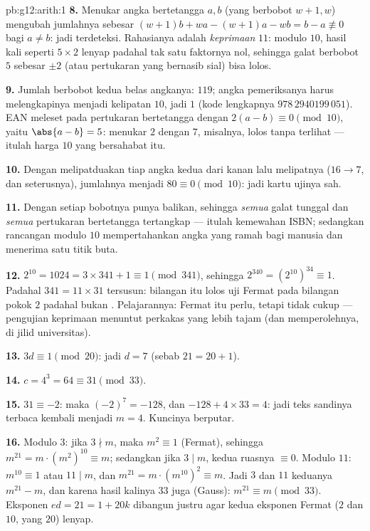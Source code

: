 \begin{solution}{pb:g12:arith:1}
\textbf{8.} Menukar angka bertetangga $a, b$ (yang berbobot
$w + 1, w$) mengubah jumlahnya sebesar
$(w+1)b + wa - (w+1)a - wb = b - a \not\equiv 0$ bagi
$a \neq b$: jadi terdeteksi. Rahasianya adalah \emph{keprimaan}
$11$: modulo $10$, hasil kali seperti $5 \times 2$ lenyap padahal
tak satu faktornya nol, sehingga galat berbobot $5$ sebesar $\pm 2$ (atau
pertukaran yang bernasib sial) bisa lolos.

\textbf{9.} Jumlah berbobot kedua belas angkanya: $119$; angka
pemeriksanya harus melengkapinya menjadi kelipatan $10$, jadi $1$ (kode
lengkapnya $978\,2940199\,051$). EAN meleset pada pertukaran bertetangga
dengan $2(a - b) \equiv 0 \pmod{10}$, yaitu
$\abs{a - b} = 5$: menukar $2$ dengan $7$, misalnya, lolos
tanpa terlihat --- itulah harga  $10$ yang bersahabat itu.

\textbf{10.} Dengan melipatduakan tiap angka kedua dari kanan lalu
melipatnya ($16 \to 7$, dan seterusnya), jumlahnya menjadi $80 \equiv 0
\pmod{10}$: jadi kartu ujinya sah.

\textbf{11.} Dengan   setiap bobotnya punya balikan,
sehingga \emph{semua} galat tunggal dan \emph{semua} pertukaran
bertetangga tertangkap --- itulah kemewahan ISBN; sedangkan rancangan modulo
$10$ mempertahankan angka yang ramah bagi manusia dan menerima satu titik buta.

\textbf{12.} $2^{10} = 1024 = 3 \times 341 + 1 \equiv 1
\pmod{341}$, sehingga $2^{340} = \left(2^{10}\right)^{34} \equiv
1$. Padahal $341 = 11 \times 31$ tersusun: bilangan itu lolos uji
Fermat pada bilangan pokok $2$ padahal bukan . Pelajarannya: 
Fermat itu perlu, tetapi tidak cukup --- pengujian keprimaan
menuntut perkakas yang lebih tajam (dan memperolehnya, di jilid
universitas).

\textbf{13.} $3d \equiv 1 \pmod{20}$: jadi $d = 7$
(sebab $21 = 20 + 1$).

\textbf{14.} $c = 4^3 = 64 \equiv 31 \pmod{33}$.

\textbf{15.} $31 \equiv -2$: maka $(-2)^7 = -128$, dan
$-128 + 4 \times 33 = 4$: jadi teks sandinya terbaca kembali menjadi
$m = 4$. Kuncinya berputar.

\textbf{16.} Modulo $3$: jika $3 \nmid m$, maka
$m^2 \equiv 1$ (Fermat), sehingga
$m^{21} = m \cdot \left(m^2\right)^{10} \equiv m$; sedangkan jika
$3 \mid m$, kedua ruasnya $\equiv 0$. Modulo $11$:
$m^{10} \equiv 1$ atau $11 \mid m$, dan
$m^{21} = m \cdot \left(m^{10}\right)^2 \equiv m$. Jadi $3$
dan $11$ keduanya  $m^{21} - m$, dan karena  hasil kalinya
$33$ juga  (Gauss): $m^{21} \equiv m \pmod{33}$. Eksponen
$ed = 21 = 1 + 20k$ dibangun justru agar kedua eksponen
Fermat ($2$ dan $10$, yang  $20$) lenyap.


\end{solution}

